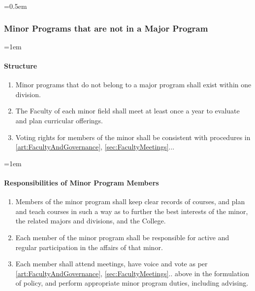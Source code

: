 \documentclass{manual}
\let\oldsubsubsection\subsubsection
\renewcommand\subsubsection{\leftskip=0.5em\oldsubsubsection}
\let\oldparagraph\paragraph
\renewcommand\paragraph{\leftskip=1em\oldparagraph}
\newcommand{\itemLevelA}{\alph*.}
\newcommand{\itemRefA}{\alph*}
\begin{document}
\subsubsection{Minor Programs that are not in a Major Program}
\paragraph{Structure}
\begin{enumerate}[label=\itemLevelA,ref=\itemRefA]
\item Minor programs that do not belong to a major program shall exist within one division.

\item The Faculty of each minor field shall meet at least once a year to evaluate and plan curricular offerings. 
\item Voting rights for members of the minor shall be consistent with procedures in \cref{art:FacultyAndGovernance}, \cref{sec:FacultyMeetings}...
\end{enumerate}

\paragraph{Responsibilities of Minor Program Members}
\begin{enumerate}[label=\itemLevelA,ref=\itemRefA]
\item Members of the minor program shall keep clear records of courses, and plan and teach courses in such a way as to further the best interests of the minor, the related majors and divisions, and the College.
\item Each member of the minor program shall be responsible for active and regular participation in the affairs of that minor.
\item Each member shall attend meetings, have voice and vote as per \cref{art:FacultyAndGovernance}, \cref{sec:FacultyMeetings}.. above in the formulation of policy, and perform appropriate minor program duties, including advising.
\end{enumerate}

\end{document}
